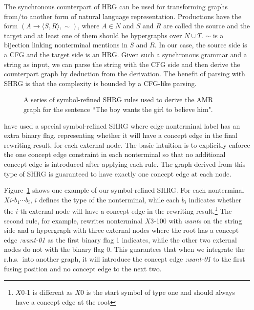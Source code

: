 The synchronous counterpart of HRG can be used for transforming graphs from/to another form of natural language representation. 
Productions have the form $(A\to \langle S, R\rangle , \sim)$, where $A \in N$ and $S$ and $R$ are called the source and the target and at least one of them should be
hypergraphs over $N\cup T$. $\sim$ is a bijection linking nonterminal mentions in $S$ and $R$.
In our case, the source side is a CFG and the target side is an HRG\@. Given such a synchronous grammar and a string as input, we can 
parse the string with the CFG side and then derive the counterpart graph by deduction from the derivation. The benefit of 
parsing with SHRG is that the complexity is bounded by a CFG-like parsing.

\begin{figure}
\begin{center}
\caption{A series of symbol-refined SHRG rules used to derive the AMR graph for the sentence ``The boy wants the girl to believe him".}
\label{fig:shrg-example}
\vspace{-1em}
\end{center}
\end{figure}
 have used a special symbol-refined SHRG where
edge nonterminal label has an extra binary
flag, representing whether it will have a concept edge in the
final rewriting result, for each external node. The basic intuition is to explicitly enforce the one concept edge constraint
in each nonterminal so that no additional concept edge is introduced after applying each rule. The graph
derived from this type of SHRG is guaranteed to have exactly one concept edge at each node.


Figure~\ref{fig:shrg-example} shows one example of our symbol-refined SHRG\@.
For each nonterminal $Xi$-$b_1\cdots b_i$, $i$ defines the type of the nonterminal, while
each $b_i$ indicates whether the $i$-th external node will have a concept edge
in the rewriting result.\footnote{$X0$-1 is different as $X0$ is the start symbol of type one and should always have a concept edge at the root}
The second rule, for example, rewrites nonterminal $X3$-100 with {\em wants} on the string side and a hypergraph with three external nodes where 
the root has a concept edge {\em :want-01} as the first binary flag 1 indicates, while the other two external nodes do not with the binary flag 0. 
This guarantees that when we integrate the r.h.s.\ into
another graph, it will introduce the concept edge {\em :want-01} to the first fusing position
and no concept edge to the next two.
